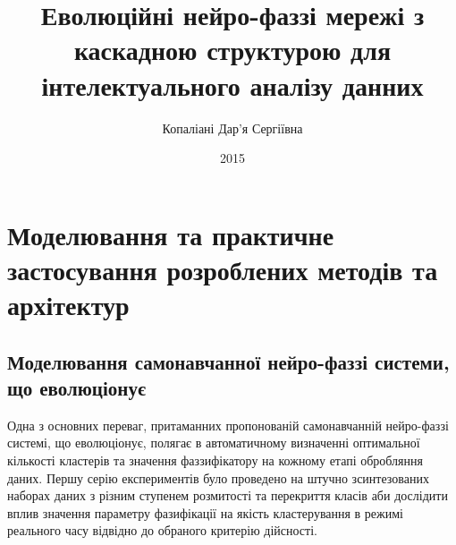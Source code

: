 \documentclass{vakthesis}
\begin{document}
  
  \title{Еволюційні нейро-фаззі мережі з каскадною структурою для інтелектуального аналізу данних}
  \author{Копаліані Дар'я Сергіївна}
	\date{2015}
	
	\maketitle
	
	\tableofcontents
	
  \newcommand{\V}[1]{\mathit{#1}}
  \let\originalleft\left
  \let\originalright\right
  \renewcommand{\left}{\mathopen{}\mathclose\bgroup\originalleft}
  \renewcommand{\right}{\aftergroup\egroup\originalright}
  \renewcommand{\floatpagefraction}{.9}%
  \renewcommand{\topfraction}{.9}


\chapter{Моделювання та практичне застосування розроблених методів та архітектур}
\label{ch:Experiments}%

\section{Моделювання самонавчанної нейро-фаззі системи, що еволюціонує}

Одна з основних переваг, притаманних пропонованій самонавчанній нейро-фаззі системі, що еволюціонує, полягає в автоматичному визначенні оптимальної кількості кластерів та значення фаззифікатору на кожному етапі обробляння даних. Першу серію експериментів було проведено на штучно зсинтезованих наборах даних з різним ступенем розмитості та перекриття класів аби дослідити вплив значення параметру фазифікації на якість кластерування в режимі реального часу відвідно до обраного критерію дійсності.
\end{document}
